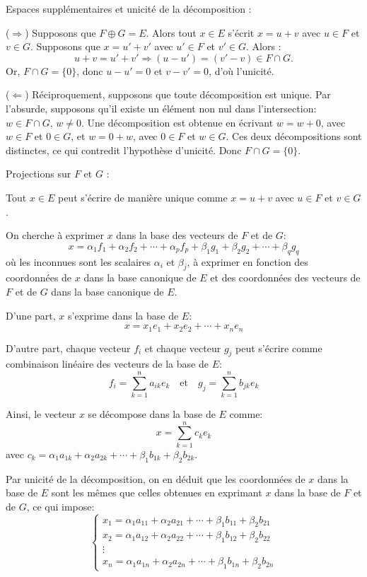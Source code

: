 \documentclass[10pt,a4paper]{article}
\begin{document}
\q Espaces supplémentaires et unicité de la décomposition :

($\Rightarrow$) Supposons que $F \oplus G = E$. Alors tout $x \in E$ s'écrit $x = u + v$
avec $u \in F$ et $v \in G$. Supposons que $x = u' + v'$ avec $u' \in F$ et $v' \in G$. Alors :
\[u + v = u' + v' \Rightarrow (u - u') = (v' - v) \in F \cap G. \] Or, $F \cap G = \{0\}$, donc $u -
u' = 0$ et $v - v' = 0$, d'où l'unicité.

($\Leftarrow$) Réciproquement, supposons que toute décomposition est unique. Par l'absurde,
supposons qu'il existe un élément non nul dans l'intersection: $w \in F \cap G$, $w \neq 0$. Une
décomposition est obtenue en écrivant $w = w + 0$, avec $w \in F$ et $0 \in G$, et $w = 0 + w$, avec
$0 \in F$ et $w \in G$. Ces deux décompositions sont distinctes, ce qui contredit l'hypothèse
d'unicité. Donc $F \cap G = \{0\}$.

\q Projections sur $F$ et $G$ :

Tout $x \in E$ peut s'écrire de manière unique comme $x = u + v$ avec $u \in F$ et $v \in G$.

On cherche à exprimer $x$ dans la base des vecteurs de $F$ et de $G$:
\[x = \alpha_1 f_1 + \alpha_2 f_2 + \cdots + \alpha_p f_p + \beta_1 g_1 + \beta_2 g_2 + \cdots +
\beta_q g_q\]
où les inconnues sont les scalaires $\alpha_i$ et $\beta_j$, à exprimer en fonction des coordonnées
de $x$ dans la base canonique de $E$ et des coordonnées des vecteurs de $F$ et de $G$ dans la base
canonique de $E$.

D'une part, $x$ s'exprime dans la base de $E$:
\[x = x_1 e_1 + x_2 e_2 + \cdots + x_n e_n\]

D'autre part, chaque vecteur $f_i$ et chaque vecteur $g_j$ peut s'écrire comme combinaison linéaire
des vecteurs de la base de $E$:
\[f_i = \sum_{k=1}^n a_{ik} e_k \quad \text{et} \quad g_j = \sum_{k=1}^n b_{jk} e_k\]

Ainsi, le vecteur $x$ se décompose dans la base de $E$ comme:
\[x = \sum_{k=1}^n c_k e_k\]
avec $c_k = \alpha_1 a_{1k} + \alpha_2 a_{2k} + \cdots + \beta_1 b_{1k} + \beta_2 b_{2k}$.

Par unicité de la décomposition, on en déduit que les coordonnées de $x$ dans la base de $E$ sont
les mêmes que celles obtenues en exprimant $x$ dans la base de $F$ et de $G$, ce qui impose:
\[\begin{cases}
x_1 = \alpha_1 a_{11} + \alpha_2 a_{21} + \cdots + \beta_1 b_{11} + \beta_2 b_{21} \\
x_2 = \alpha_1 a_{12} + \alpha_2 a_{22} + \cdots + \beta_1 b_{12} + \beta_2 b_{22} \\
\vdots \\
x_n = \alpha_1 a_{1n} + \alpha_2 a_{2n} + \cdots + \beta_1 b_{1n} + \beta_2 b_{2n}
\end{cases}\]
\end{document}
